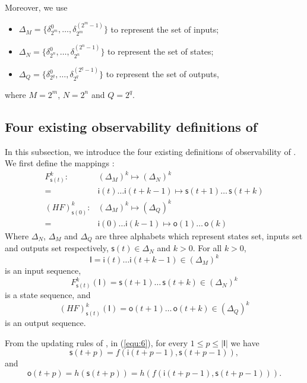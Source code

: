 Moreover, we use 
   \begin{itemize}
 \item $\Delta_M=\{\delta^0_{2^m},\ldots,\delta^{({2^m}-1)}_{2^m} \}$ to represent the set of inputs; 
 \item $\Delta_N=\{\delta^0_{2^n},\ldots,\delta^{({2^n}-1)}_{2^n} \}$ to represent the set of states; 
  \item $\Delta_Q=\{\delta^0_{2^q},\ldots,\delta^{({2^q}-1)}_{2^q} \}$ to represent the set of outputs,
\end{itemize}
where $M=2^m$, $N=2^n$ and $Q=2^q$.

\subsection{Four existing observability definitions of \BCNs}
In this subsection, we introduce the four existing definitions of observability of \BCNs. 
We first define the mappings \cite{Zhang2016Observability}:
\begin{equation}
\begin{split}
F^k_{\mathsf{s}(t)}:& (\Delta_M)^k\mapsto(\Delta_N)^k\\
=&\mathsf{i}(t)\ldots \mathsf{i}({t+k-1}) \mapsto \mathsf{s}(t+1) \ldots\, \mathsf{s}(t+k)\\
(HF)^k_{\mathsf{s}(0)} :& (\Delta_M)^k\mapsto(\Delta_Q)^k\\
 =&\mathsf{i}(0)\ldots \mathsf{i}(k-1) \mapsto \mathsf{o}(1)\ldots\, \mathsf{o}(k)
\end{split}
\label{equ:6}
\end{equation}
Where $\Delta_N$, $\Delta_M$ and $\Delta_Q$ are three alphabets which represent states set, inputs set and outputs set respectively, $\mathsf{s}(t)\in \Delta_N$ and $k>0$. For all  $k>0$,
\[\mathsf{I}=\mathsf{i}(t)\ldots \mathsf{i}({t+k-1}) \in(\Delta_M)^k\] 
is an input sequence, 
\[F^k_{\mathsf{s}(t)}(\mathsf{I})=\mathsf{s}(t+1) \ldots\, \mathsf{s}(t+k) \in(\Delta_N)^k\]
 is a state sequence, and 
 \[(HF)^k_{\mathsf{s}(t)}(\mathsf{I})=\mathsf{o}(t+1)\ldots\, \mathsf{o}(t+k) \in(\Delta_Q)^k\] 
 is an output sequence.
  
  From the updating rules of \BCNs, in (\ref{equ:6}), for every $1\le p \le |\mathsf{I}|$ we have 
 \[\mathsf{s}(t+p)=f(\mathsf{i}(t+p-1),\mathsf{s}(t+p-1)),\] 
and 
 \[\mathsf{o}(t+p)=h(\mathsf{s}(t+p))=h(f(\mathsf{i}(t+p-1),\mathsf{s}(t+p-1))).\] 

